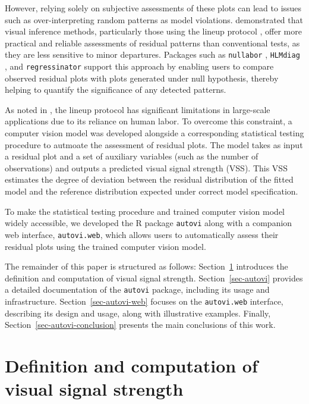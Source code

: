 \documentclass[
doublespace,
  times]{anzsauth}
\begin{document}
However, relying solely on subjective assessments of these plots can
lead to issues such as over-interpreting random patterns as model
violations. \citet{li2024plot} demonstrated that visual inference
methods, particularly those using the lineup protocol
\citep{buja2009statistical}, offer more practical and reliable
assessments of residual patterns than conventional tests, as they are
less sensitive to minor departures. Packages such as \texttt{nullabor}
\citep{nullabor}, \texttt{HLMdiag} \citep{loy2014hlmdiag}, and
\texttt{regressinator} \citep{regressinator} support this approach by
enabling users to compare observed residual plots with plots generated
under null hypothesis, thereby helping to quantify the significance of
any detected patterns.

As noted in \citet{li2024automated}, the lineup protocol has significant
limitations in large-scale applications due to its reliance on human
labor. To overcome this constraint, a computer vision model was
developed alongside a corresponding statistical testing procedure to
autmoate the assessment of residual plots. The model takes as input a
residual plot and a set of auxiliary variables (such as the number of
observations) and outputs a predicted visual signal strength (VSS). This
VSS estimates the degree of deviation between the residual distribution
of the fitted model and the reference distribution expected under
correct model specification.

To make the statistical testing procedure and trained computer vision
model widely accessible, we developed the R package \texttt{autovi}
along with a companion web interface, \texttt{autovi.web}, which allows
users to automatically assess their residual plots using the trained
computer vision model.

The remainder of this paper is structured as follows:
Section~\ref{sec-vss-desc} introduces the definition and computation of
visual signal strength. Section~\ref{sec-autovi} provides a detailed
documentation of the \texttt{autovi} package, including its usage and
infrastructure. Section~\ref{sec-autovi-web} focuses on the
\texttt{autovi.web} interface, describing its design and usage, along
with illustrative examples. Finally, Section~\ref{sec-autovi-conclusion}
presents the main conclusions of this work.

\section{Definition and computation of visual signal
strength}\label{sec-vss-desc}
\end{document}
